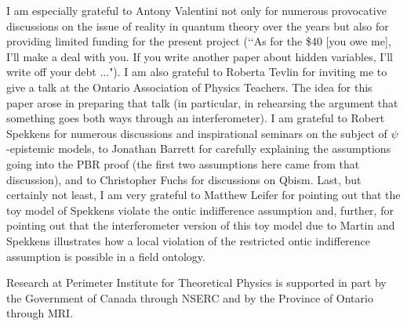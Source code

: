 \documentclass[12pt]{article}
\begin{document}
I am especially grateful to Antony Valentini not only for numerous provocative discussions on the issue of reality in quantum theory over the years but also for providing limited funding
for the present project (\lq\lq As for the \$40 [you owe me], I'll make a deal with you. If you write another paper about hidden variables, I'll write off your debt ...").  I am also
grateful to Roberta Tevlin for inviting me to give a talk at the Ontario Association of Physics Teachers.  The idea for this paper arose in preparing that talk (in particular, in rehearsing
the argument that something goes both ways through an interferometer).  I am grateful to Robert Spekkens for numerous discussions and inspirational seminars on the subject of
$\psi$-epistemic models, to Jonathan Barrett for carefully explaining the assumptions going into the PBR proof (the first two assumptions here came from that discussion), and to Christopher Fuchs for discussions on Qbism.  Last, but certainly not least, I am very grateful to Matthew Leifer for pointing out that the toy model of Spekkens violate the ontic indifference assumption and, further, for pointing out that the interferometer version of this toy model due to Martin and Spekkens illustrates how a local violation of the restricted ontic indifference assumption is possible in a field ontology.  

Research at Perimeter Institute for Theoretical Physics is supported in part by the Government of Canada through NSERC and by the Province of Ontario through MRI.

 
\end{document}
